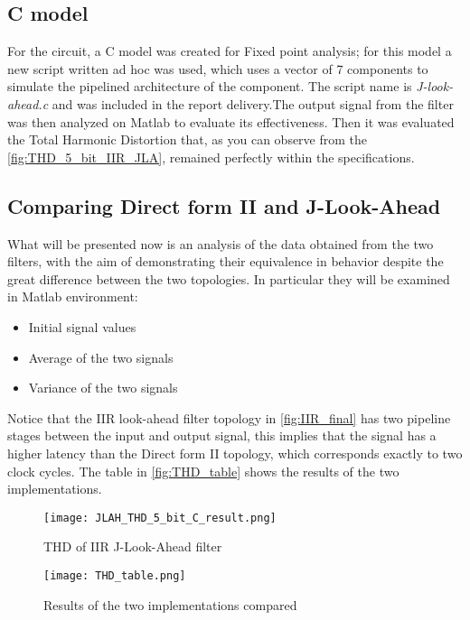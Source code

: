 \subsection{C model}

For the circuit, a C model was created for Fixed point analysis; for this model a new script written ad hoc was used, which uses a vector of 7 components to simulate the pipelined architecture of the component. The script name is \textit{J-look-ahead.c} and was included in the report delivery.The output signal from the filter was then analyzed on Matlab to evaluate its effectiveness. Then it was evaluated the Total Harmonic Distortion that, as you can observe from the \autoref{fig:THD_5_bit_IIR_JLA}, remained perfectly within the specifications.

\subsection{Comparing Direct form II and J-Look-Ahead}
What will be presented now is an analysis of the data obtained from the two filters, with the aim of demonstrating their equivalence in behavior despite the great difference between the two topologies. In particular they will be examined in Matlab environment:

\begin{itemize}
	\item Initial signal values
	\item Average of the two signals
	\item Variance of the two signals
\end{itemize}

Notice that the IIR look-ahead filter topology in \autoref{fig:IIR_final} has two pipeline stages between the input and output signal, this implies that the signal has a higher latency than the Direct form II topology, which corresponds exactly to two clock cycles. The table in \autoref{fig:THD_table} shows the results of the two implementations.

\begin{figure}[ht]
	\begin{minipage}[b]{0.5\linewidth}
		\centering
		\texttt{[image: JLAH\_THD\_5\_bit\_C\_result.png]}
		\caption{THD of IIR J-Look-Ahead filter}
		\label{fig:THD_5_bit_IIR_JLA}
	\end{minipage}
	\hspace{0.5cm}
	\begin{minipage}[b]{0.4\linewidth}
		\centering
		\texttt{[image: THD\_table.png]}
		\caption{Results of the two implementations compared}
		\label{fig:THD_table}
	\end{minipage}
\end{figure}

